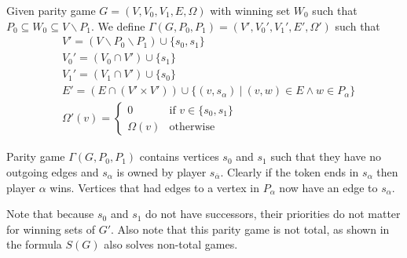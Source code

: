 \begin{definition}
	\label{def_gamma_games}
	Given parity game $G=(V,V_0,V_1,E,\Omega)$ with winning set $W_0$ such that $P_0 \subseteq W_0 \subseteq V \backslash P_1$. We define $\Gamma(G,P_0,P_1) = (V',V_0',V_1',E',\Omega')$ such that
	\begin{align*}
	&V' = (V \backslash P_0 \backslash P_1) \cup \{s_0,s_1\}\\
	&V_0' = (V_0 \cap V') \cup \{s_1\}\\
	&V_1' = (V_1 \cap V') \cup \{s_0\}\\
	&E' = (E \cap (V' \times V')) \cup \{ (v,s_\alpha)\ |\ (v,w) \in E \wedge w \in P_\alpha \}\\
	&\Omega'(v) = \begin{cases}0 & \text{if } v\in \{s_0,s_1\}\\
	\Omega(v) & \text{otherwise}\end{cases}
	\end{align*}
\end{definition}
Parity game $\Gamma(G,P_0,P_1)$ contains vertices $s_0$ and $s_1$ such that they have no outgoing edges and $s_\alpha$ is owned by player $s_{\overline{\alpha}}$. Clearly if the token ends in $s_\alpha$ then player $\alpha$ wins. Vertices that had edges to a vertex in $P_\alpha$ now have an edge to $s_\alpha$. 

Note that because $s_0$ and $s_1$ do not have successors, their priorities do not matter for winning sets of $G'$. Also note that this parity game is not total, as shown in \cite{WALUKIEWICZ2002311} the formula $S(G)$ also solves non-total games.


